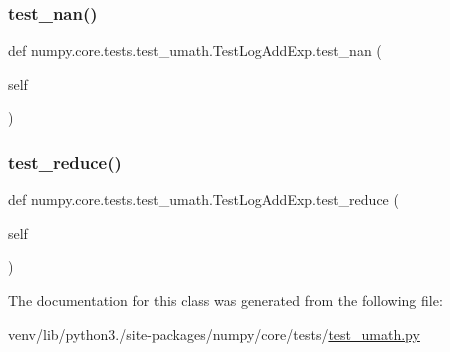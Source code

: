 \subsubsection{\texorpdfstring{test\+\_\+nan()}{test\_nan()}}
{\footnotesize\ttfamily def numpy.\+core.\+tests.\+test\+\_\+umath.\+Test\+Log\+Add\+Exp.\+test\+\_\+nan (\begin{DoxyParamCaption}\item[{}]{self }\end{DoxyParamCaption})}

\mbox{\label{classnumpy_1_1core_1_1tests_1_1test__umath_1_1TestLogAddExp_a3c7151b3bd605d84197a016e5fdda7db}} 
\subsubsection{\texorpdfstring{test\+\_\+reduce()}{test\_reduce()}}
{\footnotesize\ttfamily def numpy.\+core.\+tests.\+test\+\_\+umath.\+Test\+Log\+Add\+Exp.\+test\+\_\+reduce (\begin{DoxyParamCaption}\item[{}]{self }\end{DoxyParamCaption})}



The documentation for this class was generated from the following file\+:\begin{DoxyCompactItemize}
\item 
venv/lib/python3./site-\/packages/numpy/core/tests/\hyperlink{test__umath_8py}{test\+\_\+umath.\+py}\end{DoxyCompactItemize}
